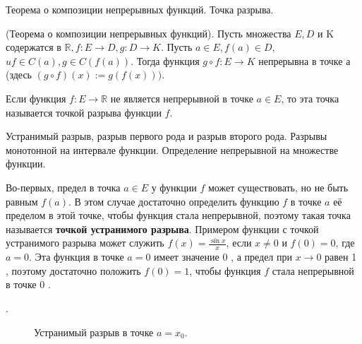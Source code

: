 \newpage
\begin{problem}
Теорема о композиции непрерывных функций. Точка разрыва.
\end{problem}
\begin{proposition}
    (Теорема о композиции непрерывных функций). Пусть множества $E, D$ и K содержатся в $\mathbb{R}, f: E \rightarrow D, g: D \rightarrow K$. Пусть $a \in E, f(a) \in D$, $u f \in C(a), g \in C(f(a))$. Тогда функция $g \circ f: E \rightarrow K$ непрерывна в точке а (здесь $(g \circ f)(x):=g(f(x)))$.
\end{proposition}

\begin{definition}
    Если функция $f: E \rightarrow \mathbb{R}$ не является непрерывной в точке $a \in E$, то эта точка называется точкой разрыва функции $f$.
\end{definition}

\newpage
\begin{problem}
Устранимый разрыв, разрыв первого рода и разрыв второго рода. Разрывы монотонной
на интервале функции. Определение непрерывной на множестве функции.
\end{problem}
Во-первых, предел в точка $a \in E$ у функции $f$ может существовать, но не быть равным $f(a)$. В этом случае достаточно определить функцию $f$ в точке $a$ её пределом в этой точке, чтобы функция стала непрерывной, поэтому такая точка называется \textbf{точкой устранимого разрыва}. Примером функции с точкой устранимого разрыва может служить $f(x)=\frac{\sin x}{x}$, если $x \neq 0$ и $f(0)=0$, где $a=0$. Эта функция в точке $a=0$ имеет значение 0 , а предел при $x \rightarrow 0$ равен 1 , поэтому достаточно положить $f(0)=1$, чтобы функция $f$ стала непрерывной в точке 0 .

. \begin{figure}[h!]
    \caption{Устранимый разрыв в точке $a=x_0$.}
    \label{fig:image}
\end{figure}

